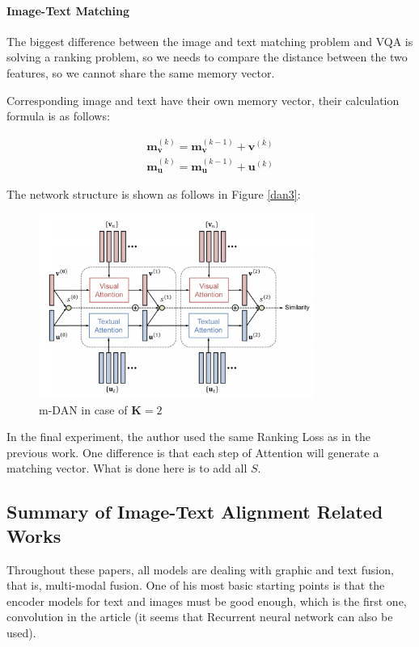 \paragraph{Image-Text Matching}
The biggest difference between the image and text matching problem and VQA is solving a ranking problem, so we needs to compare the distance between the two features, so we cannot share the same memory vector.

Corresponding image and text have their own memory vector, their calculation formula is as follows:

$$
\begin{array}{l}
\mathbf{m}_{\mathbf{v}}^{(k)}=\mathbf{m}_{\mathbf{v}}^{(k-1)}+\mathbf{v}^{(k)} \\
\mathbf{m}_{\mathbf{u}}^{(k)}=\mathbf{m}_{\mathbf{u}}^{(k-1)}+\mathbf{u}^{(k)}
\end{array}
$$

The network structure is shown as follows in Figure \ref{dan3}:

\begin{figure}[h!]
\centering
\includegraphics[width=0.8\textwidth]{dan3.pdf}
\caption{m-DAN in case of $\mathbf{K}=2$ \cite{dan}}
\label{fig:dan3}
\end{figure}

In the final experiment, the author used the same Ranking Loss as in the previous work. One difference is that each step of Attention will generate a matching vector. What is done here is to add all $S$.

\subsection{Summary of Image-Text Alignment Related Works}
Throughout these papers, all models are dealing with graphic and text fusion, that is, multi-modal fusion. One of his most basic starting points is that the encoder models for text and images must be good enough, which is the first one, convolution in the article (it seems that Recurrent neural network can also be used).

